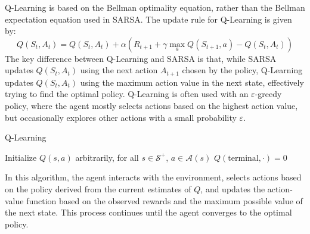 Q-Learning is based on the Bellman optimality equation, rather than the Bellman expectation equation used in SARSA.
The update rule for Q-Learning is given by:
\[Q(S_t,A_t)=Q(S_t,A_t)+\alpha\left(R_{t+1}+\gamma\max_aQ(S_{t+1},a)-Q(S_t,A_t)\right)\]
The key difference between Q-Learning and SARSA is that, while SARSA updates $Q(S_t,A_t)$ using the next action $A_{t+1}$ chosen by the policy, Q-Learning updates $Q(S_t,A_t)$ using the maximum action value in the next state, effectively trying to find the optimal policy.
Q-Learning is often used with an $\varepsilon$-greedy policy, where the agent mostly selects actions based on the highest action value, but occasionally explores other actions with a small probability $\varepsilon$. 
\begin{algorithm}[H]
    \caption{Q-Learning}
        \begin{algorithmic}[1]
            \State Initialize $Q(s,a)$ arbitrarily, for all $s\in\mathcal{S}^{+}$, $a \in \mathcal{A}(s)$
            \State $Q(\text{terminal},\cdot)=0$
            \Loop
            \EndLoop
        \end{algorithmic}
\end{algorithm}
In this algorithm, the agent interacts with the environment, selects actions based on the policy derived from the current estimates of $Q$, and updates the action-value function based on the observed rewards and the maximum possible value of the next state. 
This process continues until the agent converges to the optimal policy.

